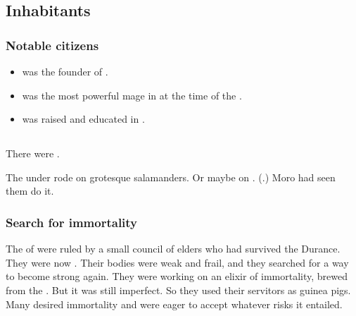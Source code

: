 \subsection{Inhabitants}





\subsubsection{Notable citizens}
\begin{itemize}
  \item 
     was the founder of \Yormis. 
    
  \item 
     was the most powerful mage in \Yormis at the time of the \thirdbanewar. 
    
  \item 
     was raised and educated in \Yormis. 
\end{itemize}









\subsection{\Ophidians}
There were .

The \quiljaaran under \Yormis rode on grotesque salamanders. 
Or maybe on .
(.)
Moro \Cobrel had seen them do it. 





\subsubsection{Search for immortality}
The \ophidians of \Yormis were ruled by a small council of elders who had survived the Durance.
They were now .
Their bodies were weak and frail, and they searched for a way to become strong again.
They were working on an elixir of immortality, brewed from the . 
But it was still imperfect.
So they used their \scathaese servitors as guinea pigs.
Many \scathae desired immortality and were eager to accept whatever risks it entailed.









